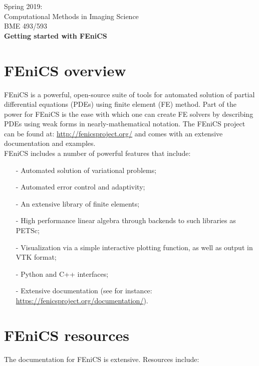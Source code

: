 \documentclass[11pt]{article}
\newcommand{\zapspace}{\topsep=0pt\partopsep=0pt\itemsep=0pt\parskip=0pt}
\begin{document}
\pagestyle{empty}

\begin{center}
\large \textsf{%
Spring 2019:\\
Computational Methods in Imaging Science\\
BME 493/593 \\[1mm]
\textbf{Getting started with FEniCS}}
\end{center}

\section{FEniCS overview}

FEniCS is a powerful, open-source suite of tools for automated
solution of partial differential equations (PDEs) using finite element (FE) method.
Part of the power for FEniCS
is the ease with which one can create FE solvers by describing PDEs
using weak forms in nearly-mathematical notation. The FEniCS project
can be found at:
\url{http://fenicsproject.org/} and comes with an extensive documentation and examples.\\

\noindent FEniCS includes a number of powerful features that include:
\vspace{-0.1in}
\begin{itemize}
\zapspace
\item[-] Automated solution of variational problems;
\item[-] Automated error control and adaptivity;
\item[-] An extensive library of finite elements;
\item[-] High performance linear algebra through backends to such
  libraries as PETSc;
\item[-] Visualization via a simple interactive plotting function, as
  well as output in VTK format;
\item[-] Python and C++ interfaces;
\item[-] Extensive documentation (see for instance:
  \url{https://fenicsproject.org/documentation/}).
\end{itemize}

\section{FEniCS resources}

The documentation for FEniCS is extensive. Resources include:
\end{document}
